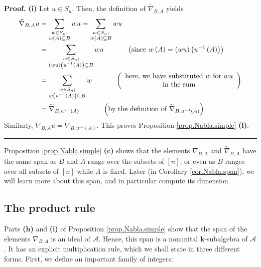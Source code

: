 \documentclass[numbers=enddot,12pt,final,onecolumn,notitlepage]{scrartcl}%
\numberwithin{exer}{subsection}
\theoremstyle{definition}
\newenvironment{proof}[1][Proof]{\noindent\textbf{#1.} }{\ \rule{0.5em}{0.5em}}
\let\sumnonlimits\sum
\renewcommand{\sum}{\sumnonlimits\limits}
\begin{document}
\begin{proof}
\textbf{(i)} Let $u\in S_{n}$. Then, the definition of $\widetilde{\nabla
}_{B,A}$ yields
\begin{align*}
\widetilde{\nabla}_{B,A}u  &  =\sum_{\substack{w\in S_{n};\\w\left(  A\right)
\subseteq B}}wu=\sum_{\substack{w\in S_{n};\\w\left(  A\right)  \subseteq
B}}wu\\
&  =\sum_{\substack{w\in S_{n};\\\left(  wu\right)  \left(  u^{-1}\left(
A\right)  \right)  \subseteq B}}wu\ \ \ \ \ \ \ \ \ \ \left(  \text{since
}w\left(  A\right)  =\left(  wu\right)  \left(  u^{-1}\left(  A\right)
\right)  \right) \\
&  =\sum_{\substack{w\in S_{n};\\w\left(  u^{-1}\left(  A\right)  \right)
\subseteq B}}w\ \ \ \ \ \ \ \ \ \ \left(
\begin{array}
[c]{c}%
\text{here, we have substituted }w\text{ for }wu\\
\text{in the sum}%
\end{array}
\right) \\
&  =\widetilde{\nabla}_{B,u^{-1}\left(  A\right)  }\ \ \ \ \ \ \ \ \ \ \left(
\text{by the definition of }\widetilde{\nabla}_{B,u^{-1}\left(  A\right)
}\right)  .
\end{align*}
Similarly, $\nabla_{B,A}u=\nabla_{B,u^{-1}\left(  A\right)  }$. This proves
Proposition \ref{prop.Nabla.simple} \textbf{(i)}.
\end{proof}

Proposition \ref{prop.Nabla.simple} \textbf{(c)} shows that the elements
$\nabla_{B,A}$ and $\widetilde{\nabla}_{B,A}$ have the same span as $B$ and
$A$ range over the subsets of $\left[  n\right]  $, or even as $B$ ranges over
all subsets of $\left[  n\right]  $ while $A$ is fixed. Later (in Corollary
\ref{cor.Nabla.span}), we will learn more about this span, and in particular
compute its dimension.

\subsection{The product rule}

Parts \textbf{(h)} and \textbf{(i)} of Proposition \ref{prop.Nabla.simple}
show that the span of the elements $\nabla_{B,A}$ is an ideal of $\mathcal{A}%
$. Hence, this span is a nonunital $\mathbf{k}$-subalgebra of $\mathcal{A}$.
It has an explicit multiplication rule, which we shall state in three
different forms. First, we define an important family of integers:
\end{document}

